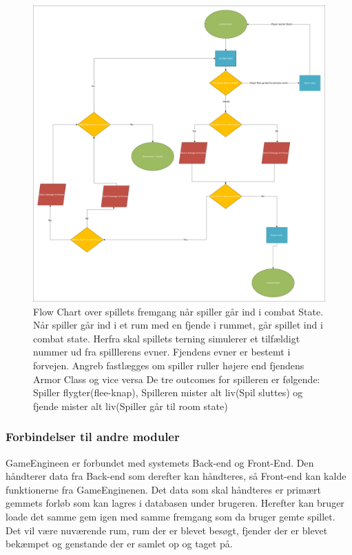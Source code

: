 \begin{figure}[H]
\centering
\includegraphics[width = \textwidth]{02-Body/Images/Arkitektur - Combat State.pdf}
\caption{Flow Chart over spillets fremgang når spiller går ind i combat State. Når spiller går ind i et rum med en fjende i rummet, går spillet ind i combat state. Herfra skal spillets terning simulerer et tilfældigt nummer ud fra spilllerens evner. Fjendens evner er bestemt i forvejen. Angreb fastlægges om spiller ruller højere end fjendens Armor Class og vice versa De tre outcomes for spilleren er følgende: Spiller flygter(flee-knap), Spilleren mister alt liv(Spil sluttes) og fjende mister alt liv(Spiller går til room state)}
\label{fig:Arkitektur-SD-SaveGame}
\end{figure}
\subsubsection{Forbindelser til andre moduler}
GameEngineen er forbundet med systemets Back-end og Front-End. Den håndterer data fra Back-end som derefter kan håndteres, så Front-end kan kalde funktionerne fra GameEnginenen. Det data som skal håndteres er primært gemmets forløb som kan lagres i databasen under brugeren. Herefter kan bruger loade det samme gem igen med samme fremgang som da bruger gemte spillet. Det vil være nuværende rum, rum der er blevet besøgt, fjender der er blevet bekæmpet og genstande der er samlet op og taget på.